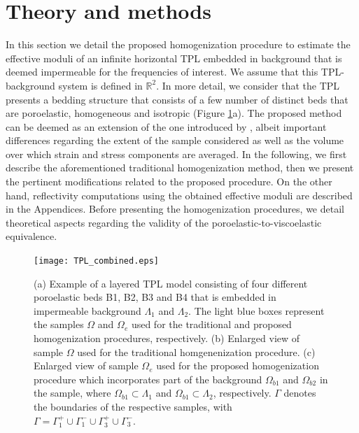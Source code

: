 \documentclass[draft]{agujournal2019}
\begin{document}
\section{Theory and methods}
In this section we detail the proposed homogenization procedure to estimate the effective moduli of an infinite horizontal TPL embedded in background that is deemed impermeable for the frequencies of interest. We assume that this TPL-background system is defined in $\mathbb R^2$. In more detail, we consider that the TPL presents a bedding structure that consists of a few number of distinct beds that are poroelastic, homogeneous and isotropic (Figure \ref{fig.1}a). The proposed method can be deemed as an extension of the one introduced by , albeit important differences regarding the extent of the sample considered as well as the volume over which strain and stress components are averaged. In the following, we first describe the aforementioned traditional homogenization method, then we present the pertinent modifications related to the proposed procedure. On the other hand, reflectivity computations using the obtained effective moduli are described in the Appendices. Before presenting the homogenization procedures,
we detail theoretical aspects regarding the validity of the poroelastic-to-viscoelastic equivalence.

\begin{figure}[!ht]
\centering
        \texttt{[image: TPL\_combined.eps]}
\caption{ (a) Example of a layered TPL model consisting of four different poroelastic beds B1, B2, B3 and B4 that is embedded in impermeable background $\Lambda_1$ and $\Lambda_2$. The light blue boxes represent the samples $\Omega$ and $\Omega_e$ used for the traditional and proposed homogenization procedures, respectively. (b) Enlarged view of sample $\Omega$  used for the traditional homgenenization procedure. (c) Enlarged view of sample $\Omega_e$  used for the proposed homogenization procedure which incorporates part of the background $\Omega_{b1}$ and $\Omega_{b2}$ in the sample, where $\Omega_{b1} \subset \Lambda_1$ and $\Omega_{b1} \subset \Lambda_2$, respectively. $\Gamma$ denotes the boundaries of the respective samples, with  $\Gamma = \Gamma_1^+ \cup \Gamma_1^- \cup \Gamma_3^+ \cup \Gamma_3^-$.
}
\label{fig.1}
\end{figure}
\end{document}
